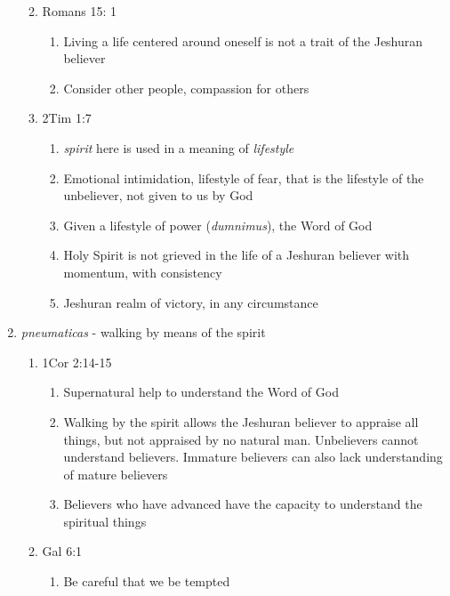 \documentclass[11pt]{article}
\begin{document}
\begin{enumerate}
\begin{enumerate}
\begin{enumerate}
		\end{enumerate}
		\item Romans 15: 1
		\begin{enumerate}
			\item Living a life centered around oneself is not a trait of the Jeshuran believer
			\item Consider other people, compassion for others
		\end{enumerate}
		\item 2Tim 1:7
		\begin{enumerate}
			\item \emph{spirit} here is used in a meaning of \emph{lifestyle}
			\item Emotional intimidation, lifestyle of fear, that is the lifestyle of the unbeliever, not given to us by God
			\item Given a lifestyle of power (\emph{dumnimus}), the Word of God
			\item Holy Spirit is not grieved in the life of a Jeshuran believer with momentum, with consistency
			\item Jeshuran realm of victory, in any circumstance
		\end{enumerate}
		
	\end{enumerate}
	\item \emph{pneumaticas} - walking by means of the spirit
	\begin{enumerate}
		\item 1Cor 2:14-15
		\begin{enumerate}
			\item Supernatural help to understand the Word of God
			\item Walking by the spirit allows the Jeshuran believer to appraise all things, but not appraised by no natural man. Unbelievers cannot understand believers. Immature believers can also lack understanding of mature believers
			\item Believers who have advanced have the capacity to understand the spiritual things
		\end{enumerate}
		\item Gal 6:1
		\begin{enumerate}
			\item Be careful that we be tempted
		\end{enumerate}
	\end{enumerate}
\end{enumerate}
\end{document}
